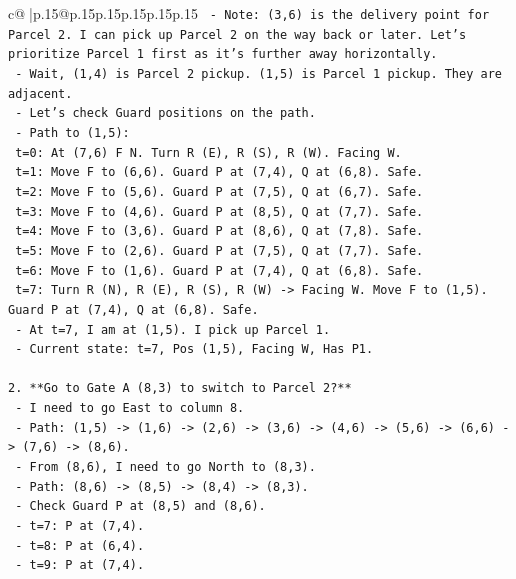 \documentclass{article}
\begin{document}
{\begin{supertabular}{c@{$\;$}|p{.15\linewidth}@{}p{.15\linewidth}p{.15\linewidth}p{.15\linewidth}p{.15\linewidth}p{.15\linewidth}}
{{{\texttt{    {-} Note: (3,6) is the delivery point for Parcel 2. I can pick up Parcel 2 on the way back or later. Let's prioritize Parcel 1 first as it's further away horizontally.} \\
\texttt{    {-} Wait, (1,4) is Parcel 2 pickup. (1,5) is Parcel 1 pickup. They are adjacent.} \\
\texttt{    {-} Let's check Guard positions on the path.} \\
\texttt{    {-} Path to (1,5):} \\
\texttt{      t=0: At (7,6) F N. Turn R (E), R (S), R (W). Facing W.} \\
\texttt{      t=1: Move F to (6,6). Guard P at (7,4), Q at (6,8). Safe.} \\
\texttt{      t=2: Move F to (5,6). Guard P at (7,5), Q at (6,7). Safe.} \\
\texttt{      t=3: Move F to (4,6). Guard P at (8,5), Q at (7,7). Safe.} \\
\texttt{      t=4: Move F to (3,6). Guard P at (8,6), Q at (7,8). Safe.} \\
\texttt{      t=5: Move F to (2,6). Guard P at (7,5), Q at (7,7). Safe.} \\
\texttt{      t=6: Move F to (1,6). Guard P at (7,4), Q at (6,8). Safe.} \\
\texttt{      t=7: Turn R (N), R (E), R (S), R (W) {-}> Facing W. Move F to (1,5). Guard P at (7,4), Q at (6,8). Safe.} \\
\texttt{      {-} At t=7, I am at (1,5). I pick up Parcel 1.} \\
\texttt{      {-} Current state: t=7, Pos (1,5), Facing W, Has P1.} \\
\\ 
\texttt{2.  **Go to Gate A (8,3) to switch to Parcel 2?**} \\
\texttt{    {-} I need to go East to column 8.} \\
\texttt{    {-} Path: (1,5) {-}> (1,6) {-}> (2,6) {-}> (3,6) {-}> (4,6) {-}> (5,6) {-}> (6,6) {-}> (7,6) {-}> (8,6).} \\
\texttt{    {-} From (8,6), I need to go North to (8,3).} \\
\texttt{    {-} Path: (8,6) {-}> (8,5) {-}> (8,4) {-}> (8,3).} \\
\texttt{    {-} Check Guard P at (8,5) and (8,6).} \\
\texttt{      {-} t=7: P at (7,4).} \\
\texttt{      {-} t=8: P at (6,4).} \\
\texttt{      {-} t=9: P at (7,4).} \\
}}}
\end{supertabular}}
\end{document}
